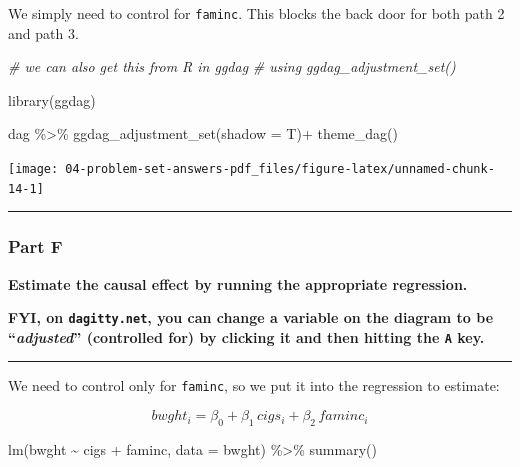 \documentclass[
]{article}
\newenvironment{Shaded}{\begin{snugshade}}{\end{snugshade}}
\newcommand{\AttributeTok}[1]{\textcolor[rgb]{0.77,0.63,0.00}{#1}}
\newcommand{\CommentTok}[1]{\textcolor[rgb]{0.56,0.35,0.01}{\textit{#1}}}
\newcommand{\FunctionTok}[1]{\textcolor[rgb]{0.00,0.00,0.00}{#1}}
\newcommand{\NormalTok}[1]{#1}
\newcommand{\SpecialCharTok}[1]{\textcolor[rgb]{0.00,0.00,0.00}{#1}}
\begin{document}
We simply need to control for \texttt{faminc}. This blocks the back door
for both path 2 and path 3.

\begin{Shaded}
\begin{Highlighting}[]
\CommentTok{\# we can also get this from R in ggdag}
\CommentTok{\# using ggdag\_adjustment\_set()}

\FunctionTok{library}\NormalTok{(ggdag)}

\NormalTok{dag }\SpecialCharTok{\%\textgreater{}\%}
  \FunctionTok{ggdag\_adjustment\_set}\NormalTok{(}\AttributeTok{shadow =}\NormalTok{ T)}\SpecialCharTok{+}
  \FunctionTok{theme\_dag}\NormalTok{()}
\end{Highlighting}
\end{Shaded}

\texttt{[image: 04-problem-set-answers-pdf\_files/figure-latex/unnamed-chunk-14-1]}

\begin{center}\rule{0.5\linewidth}{0.5pt}\end{center}

\hypertarget{part-f}{%
\subsubsection{Part F}\label{part-f}}

\textbf{Estimate the causal effect by running the appropriate
regression.}

\textbf{FYI, on \texttt{dagitty.net}, you can change a variable on the
diagram to be ``\emph{adjusted}'' (controlled for) by clicking it and
then hitting the \texttt{A} key.}

\begin{center}\rule{0.5\linewidth}{0.5pt}\end{center}

We need to control only for \texttt{faminc}, so we put it into the
regression to estimate:

\[bwght_i=\beta_0+\beta_1 \, cigs_i+\beta_2 \,faminc_i\]

\begin{Shaded}
\begin{Highlighting}[]
\FunctionTok{lm}\NormalTok{(bwght }\SpecialCharTok{\textasciitilde{}}\NormalTok{ cigs }\SpecialCharTok{+}\NormalTok{ faminc, }\AttributeTok{data =}\NormalTok{ bwght) }\SpecialCharTok{\%\textgreater{}\%} \FunctionTok{summary}\NormalTok{()}
\end{Highlighting}
\end{Shaded}
\end{document}
